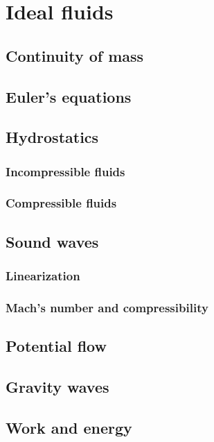 \part{Ideal fluids}

\chapter{Continuity of mass}


\chapter{Euler's equations}



\chapter{Hydrostatics}

\section{Incompressible fluids}

\section{Compressible fluids}

\chapter{Sound waves}

%

\section{Linearization}

\section{Mach's number and compressibility}


\chapter{Potential flow}


\chapter{Gravity waves}



\chapter{Work and energy}



